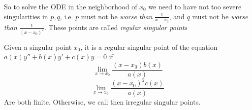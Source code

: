 So to solve the ODE in the neighborhood of $x_0$ we need to have not too severe
singularities in $p,q$, i.e. $p$ must not be \emph{worse than} $\frac{1}{x-x_0}$, and $q$
must not be \emph{worse than} $\frac{1}{(x-x_0)^2}$. These points are called
\emph{regular singular points}

\begin{definition}
  Given a singular point $x_0$, it is a regular singular point of the equation
  $a(x)y''+b(x)y'+c(x)y =0$ if 
  \[\lim_{x\to x_0} \frac{(x-x_0) b(x)}{a(x)}\]  
  \[\lim_{x\to x_0} \frac{(x-x_0)^2 c(x)}{a(x)}\]  
  Are both finite. Otherwise, we call then irregular singular points.
  \label{regularSingularPoint}
\end{definition}

